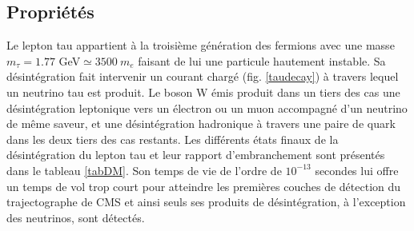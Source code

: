 \subsection{Propriétés}
\label{tau properties}
Le lepton tau appartient à la troisième génération des fermions avec une masse $m_{\tau}=1.77$ GeV$\simeq3500~m_e$ faisant de lui une particule hautement instable. Sa désintégration fait intervenir un courant chargé (fig. \ref{taudecay}) à travers lequel un neutrino tau est produit. Le boson W émis produit dans un tiers des cas une désintégration leptonique vers un électron ou un muon accompagné d'un neutrino de même saveur, et une désintégration hadronique à travers une paire de quark dans les deux tiers des cas restants. Les différents états finaux de la désintégration du lepton tau et leur rapport d'embranchement sont présentés dans le tableau \ref{tabDM}. Son temps de vie de l'ordre de $10^{-13}$ secondes lui offre un temps de vol trop court pour atteindre les premières couches de détection du trajectographe de CMS et ainsi seuls ses produits de désintégration, à l'exception des neutrinos, sont détectés. \\

